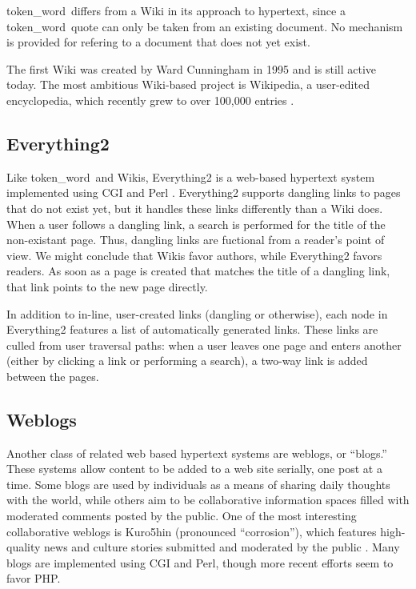 \documentclass{acm_proc_article-sp}
\newcommand{\tw}{token\_word}
\begin{document}
\tw \  differs from a Wiki in its approach to hypertext, since a \tw \  quote can only be taken from an existing document.
No mechanism is provided for refering to a document that does not yet exist.


The first Wiki was created by Ward Cunningham in 1995 and is still active today\cite{WikiWikiWeb}.
The most ambitious Wiki-based project is Wikipedia, a user-edited encyclopedia, which recently grew to over 100,000 entries \cite{Wikipedia}.


\subsection{Everything2}
Like \tw \  and Wikis, Everything2 is a web-based hypertext system implemented using CGI and Perl \cite{Everything2}.
Everything2 supports dangling links to pages that do not exist yet, but it handles these links differently than a Wiki does.
When a user follows a dangling link, a search is performed for the title of the non-existant page.
Thus, dangling links are fuctional from a reader's point of view.
We might conclude that Wikis favor authors, while Everything2 favors readers.
As soon as a page is created that matches the title of a dangling link, that link points to the new page directly.

In addition to in-line, user-created links (dangling or otherwise), each node in Everything2 features a list of automatically generated links.
These links are culled from user traversal paths:  when a user leaves one page and enters another (either by clicking a link or performing a search), a two-way link is added between the pages.   


\subsection{Weblogs}
Another class of related web based hypertext systems are weblogs, or ``blogs.''
These systems allow content to be added to a web site serially, one post at a time.
Some blogs are used by individuals as a means of sharing daily thoughts with the world, while others aim to be collaborative information spaces filled with moderated comments posted by the public.
One of the most interesting collaborative weblogs is Kuro5hin (pronounced ``corrosion''), which features high-quality news and culture stories submitted and moderated by the public \cite{kuro5hin}.
Many blogs are implemented using CGI and Perl, though more recent efforts seem to favor PHP.
\end{document}
